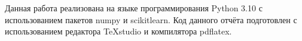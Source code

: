 Данная работа реализована на языке программирования Python 3.10 с использованием пакетов numpy и scikitlearn. Код данного отчёта подготовлен с использованием редактора TeXstudio и компилятора pdflatex.